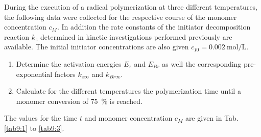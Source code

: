 \begin{question}
During the execution of a radical polymerization at three different temperatures, the following data were collected for the respective course of the monomer concentration $c_M$. In addition the rate constants of the initiator decomposition reaction $k_z$ determined in kinetic investigations performed previously are available. The initial initiator concentrations are also given $c_{I0} = \SI{0.002}{\mole\per\liter}$.
\renewcommand{\labelenumi}{\alph{enumi})}
\begin{enumerate}
\item Determine the activation energies $E_z$ and $E_{Br}$ as well the corresponding pre-exponential factors $k_{z\infty}$ and $k_{Br\infty}$.
\item Calculate for the different temperatures the polymerization time until a monomer conversion of \SI{75}{\percent} is reached.
\end{enumerate}
\begin{table}[H]
\centering
{}
\end{table}
The values for the time $t$ and monomer concentration $c_M$ are given in Tab. \ref{tab9:1} to \ref{tab9:3}.
\end{question}


